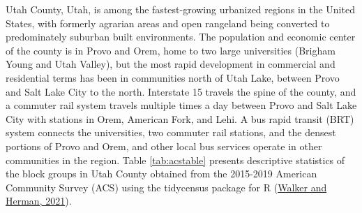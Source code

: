 \documentclass[3p, authoryear, review]{elsarticle} %
\begin{document}
Utah County, Utah, is among the fastest-growing urbanized regions in the United
States, with formerly agrarian areas and open rangeland being converted to
predominately suburban built environments. The population and economic center of
the county is in Provo and Orem, home to two large universities (Brigham Young
and Utah Valley), but the most rapid development in commercial and residential
terms has been in communities north of Utah Lake, between Provo and Salt Lake
City to the north. Interstate 15 travels the spine of the county, and a commuter
rail system travels multiple times a day between Provo and Salt Lake City with
stations in Orem, American Fork, and Lehi. A bus rapid transit (BRT) system connects
the universities, two commuter rail stations, and the densest portions of Provo
and Orem, and other local bus services operate in other communities in the region.
Table \ref{tab:acstable} presents descriptive statistics of
the block groups in Utah County obtained from the 2015-2019 American Community
Survey (ACS) using the tidycensus package for R (\protect\hyperlink{ref-tidycensus}{Walker and Herman, 2021}).

\begin{table}

\caption{\label{tab:acstable}Block Group Summary Statistics}
\centering
{}
\end{table}
\end{document}
